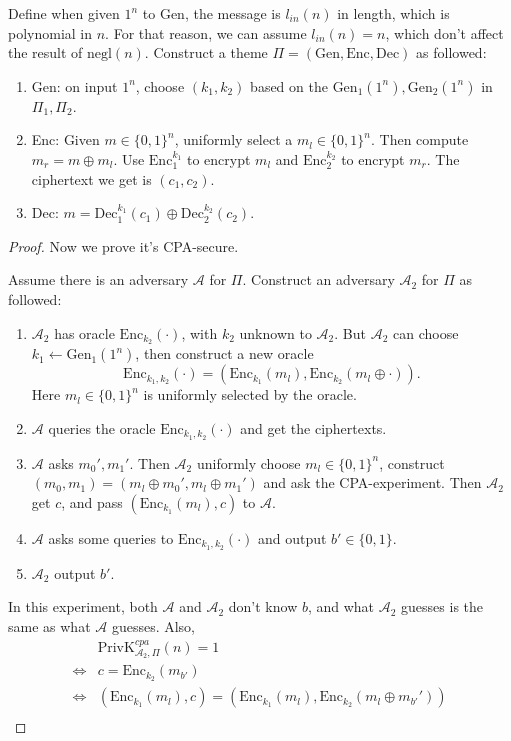 \documentclass[12pt]{article}
\newcommand{\privk}{\text{PrivK}}
\newcommand{\negl}{\text{negl}}
\newcommand{\Enc}{\text{Enc}}
\newcommand{\Dec}{\text{Dec}}
\newcommand{\Gen}{\text{Gen}}
\newcommand{\A}{\mathcal{A}}
\newenvironment{problem}[2][Problem]{\begin{trivlist}
\item[\hskip \labelsep {\bfseries #1}\hskip \labelsep {\bfseries #2.}]}{\end{trivlist}}
\begin{document}
\begin{problem}{3.29}
Define when given $1^n$ to Gen, the message is $l_{in}(n)$ in length, which is polynomial in $n$. For that reason, we can assume $l_{in}(n)=n$, which don't affect the result of $\negl(n)$.  
Construct a theme $\Pi=(\Gen, \Enc, \Dec)$ as followed:
\begin{enumerate}
    \item Gen: on input $1^n$, choose $(k_1,k_2)$ based on the $\Gen_1(1^n), \Gen_2(1^n)$ in $\Pi_1, \Pi_2$. 
    \item Enc: Given $m\in\{0,1\}^n$, uniformly select a $m_l\in\{0,1\}^n$. Then compute $m_r=m\oplus m_l$. Use $\Enc_1^{k_1}$ to encrypt $m_l$ and $\Enc_2^{k_2}$ to encrypt $m_r$. The ciphertext we get is $(c_1,c_2)$.
    \item Dec: $m=\Dec_1^{k_1}(c_1)\oplus \Dec_2^{k_2}(c_2).$
\end{enumerate}
\begin{proof}
Now we prove it's CPA-secure.\par
Assume there is an adversary $\A$ for $\Pi$. Construct an adversary $\A_2$ for $\Pi$ as followed:
\begin{enumerate}
    \item $\A_2$ has oracle $\Enc_{k_2}(\cdot)$, with $k_2$ unknown to $\A_2$. But $\A_2$ can choose $k_1\leftarrow\Gen_1(1^n)$, then construct a new oracle $$\Enc_{k_1,k_2}(\cdot)=(\Enc_{k_1}(m_l),\Enc_{k_2}( m_l\oplus\cdot)).$$ Here $m_l\in\{0,1\}^n$ is uniformly selected by the oracle.
    \item $\A$ queries the oracle $\Enc_{k_1,k_2}(\cdot)$ and get the ciphertexts. 
    \item $\A$ asks $m_0',m_1'$. Then $\A_2$ uniformly choose $m_l\in\{0,1\}^n$, construct $(m_0,m_1)=(m_l\oplus m_0',m_l\oplus m_1')$ and ask the CPA-experiment. Then $\A_2$ get $c$, and pass $(\Enc_{k_1}(m_l),c)$ to $\A$. 
    \item $\A$ asks some queries to $\Enc_{k_1,k_2}(\cdot)$ and output $b'\in\{0,1\}$.
    \item $\A_2$ output $b'$. 
\end{enumerate}
In this experiment, both $\A$ and $\A_2$ don't know $b$, and what $\A_2$ guesses is the same as what $\A$ guesses. Also, 
\begin{align*}
    &\privk_{\A_2,\Pi}^{cpa}(n)=1\\
    \Leftrightarrow &c=\Enc_{k_2}(m_{b'})\\
    \Leftrightarrow &(\Enc_{k_1}(m_l),c)=(\Enc_{k_1}(m_l),\Enc_{k_2}(m_l\oplus m_{b'}'))\\

\end{align*}
\end{proof}
\end{problem}
\end{document}
